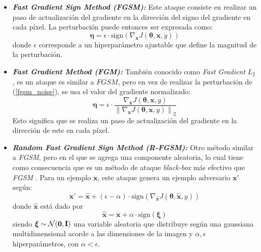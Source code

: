\documentclass[conference]{IEEEtran}
\newcommand{\norm}[1]{\left\lVert#1\right\rVert}
\begin{document}
\begin{itemize}
	\item \textbf{\textit{Fast Gradient Sign Method (FGSM):}} Este ataque consiste en realizar un paso de actualización del gradiente en la dirección del signo del gradiente en cada píxel. La perturbación puede entonces ser expresada como:
		\begin{equation}\label{fgsm_noise}
			\bm{\eta}=\epsilon\cdot \text{sign}(\nabla_{\bm{x}}J(\bm{\theta}, \bm{x}, y))
		\end{equation}
donde $\epsilon$ corresponde a un hiperparámetro ajustable que define la magnitud de la perturbación.
\item \textbf{\textit{Fast Gradient Method (FGM):}} También conocido como \textit{Fast Gradient} $L_2$ \cite{kurakin2016}, es un ataque es similar a $FGSM$, pero en vez de realizar la perturbación de (\ref{fgsm_noise}), se usa el valor del gradiente normalizado:
	\begin{equation}\label{fgm_noise}
	\bm{\eta}=\epsilon\cdot \frac{\nabla_{\bm{x}}J(\bm{\theta}, \bm{x}, y)}{\norm{\nabla_{\bm{x}}J(\bm{\theta}, \bm{x}, y)}_2}
	\end{equation}
Esto significa que se realiza un paso de actualización del gradiente en la dirección de este en cada píxel.
\item \textbf{\textit{Random Fast Gradient Sign Method (R-FGSM):}} Otro método similar a \textit{FGSM}, pero en el que se agrega una componente aleatoria, lo cual tiene como consecuencia que es un método de ataque \textit{black-box} más efectivo que \textit{FGSM} \cite{tramer2017}. Para un ejemplo $\bm{x}$, este ataque genera un ejemplo adversario $\bm{x'}$ según:
	\begin{equation}
		\bm{x'}=\bm{\hat{x}} + (\epsilon - \alpha) \cdot \text{sign}(\nabla_{\bm{\hat{x}}} J(\bm{\theta}, \bm{\hat{x}}, y))
	\end{equation}
	donde $\bm{\hat{x}}$ está dado por
\begin{equation}
\bm{\hat{x}}=\bm{x} + \alpha \cdot \text{sign}(\bm{\xi})
\end{equation}
siendo $\bm{\xi}\sim\mathcal{N}(\bm{0}, \text{\textbf{I}})$ una variable aleatoria que distribuye según una gaussiana multidimensional acorde a las dimensiones de la imagen y $\alpha, \epsilon$ hiperparámetros, con $\alpha < \epsilon$.


\end{itemize}
\end{document}
